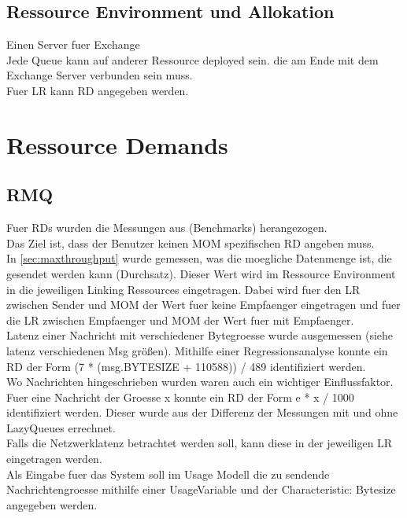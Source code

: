 \subsection{Ressource Environment und Allokation}
Einen Server fuer Exchange \\
Jede Queue kann auf anderer Ressource deployed sein. die am Ende mit dem Exchange Server verbunden sein muss.\\
Fuer LR kann RD angegeben werden.

\section{Ressource Demands}
\subsection{RMQ}
\label{sec:rmqRd}
Fuer RDs wurden die Messungen aus (Benchmarks) herangezogen. \\ 
Das Ziel ist, dass der Benutzer keinen MOM spezifischen RD angeben muss. \\
In \autoref{sec:maxthroughput} wurde gemessen, was die moegliche Datenmenge ist, die gesendet werden kann (Durchsatz). Dieser Wert wird im Ressource Environment in die jeweiligen Linking Ressources eingetragen. Dabei wird fuer den LR zwischen Sender und MOM der Wert fuer keine Empfaenger eingetragen und fuer die LR zwischen Empfaenger und MOM der Wert fuer mit Empfaenger. \\

Latenz einer Nachricht mit verschiedener Bytegroesse wurde ausgemessen (siehe latenz verschiedenen Msg größen). Mithilfe einer Regressionsanalyse konnte ein RD der Form (7 * (msg.BYTESIZE + 110588)) / 489 identifiziert werden.\\

Wo Nachrichten hingeschrieben wurden waren auch ein wichtiger Einflussfaktor. Fuer eine Nachricht der Groesse x konnte ein RD der Form e * x / 1000 identifiziert werden. Dieser wurde aus der Differenz der Messungen mit und ohne LazyQueues errechnet. \\

Falls die Netzwerklatenz betrachtet werden soll, kann diese in der jeweiligen LR eingetragen werden.\\

Als Eingabe fuer das System soll im Usage Modell die zu sendende Nachrichtengroesse mithilfe einer UsageVariable und der Characteristic: Bytesize angegeben werden.\\

